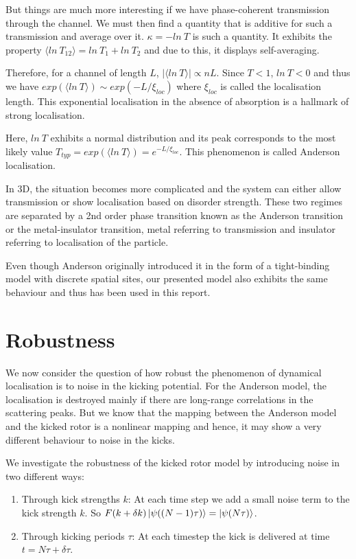 \documentclass[twocolumn,nobalancelastpage]{report}
\begin{document}
But things
are much more interesting if we have phase-coherent transmission through
the channel. We must then find a quantity that is additive for such a
transmission and average over it. $\kappa = - ln\ T$ is such a quantity.
It exhibits the property $\langle ln\ T_{12} \rangle = ln\ T_1 + ln\ T_2$ and
due to this, it displays self-averaging.

Therefore, for a channel of
length $L$, $|\langle ln\ T \rangle| \propto nL$. Since $T < 1$, $ln\ T < 0$
and thus we have $exp(\langle ln\ T \rangle) \sim exp(-L/\xi_{loc})$ where
$\xi_{loc}$ is called the localisation length. This exponential localisation
in the absence of absorption is a hallmark of strong localisation.

Here,
$ln\ T$ exhibits a normal distribution and its peak corresponds to the most
likely value $T_{typ} = exp(\langle ln\ T \rangle) = e^{-L/\xi_{loc}}$. This
phenomenon is called Anderson localisation.

In 3D, the situation becomes
more complicated and the system can either allow transmission or show
localisation based on disorder strength. These two regimes are separated by
a 2nd order phase transition known as the Anderson transition or the
metal-insulator transition, metal referring to transmission and insulator
referring to localisation of the particle.

Even though Anderson originally
introduced it in the form of a tight-binding model with discrete spatial
sites, our presented model also exhibits the same behaviour and thus has
been used in this report.

\section{Robustness}
We now consider the question of how robust the phenomenon of dynamical
localisation is to noise in the kicking potential. For the Anderson model,
the localisation is destroyed mainly if there are long-range correlations
in the scattering peaks. But we know that the mapping between the Anderson
model and the kicked rotor is a nonlinear mapping and hence, it may show
a very different behaviour to noise in the kicks.

We investigate the robustness of the kicked rotor model by introducing noise
in two different ways:
\begin{enumerate}
    \item Through kick strengths $k$: At each time step we add a small noise
    term to the kick strength $k$. So $F(k+\delta k)\ket{\psi((N-1)\tau)} =
    \ket{\psi(N\tau)}$.

    \item Through kicking periods $\tau$: At each timestep the kick is
    delivered at time $t = N\tau + \delta \tau$.
\end{enumerate}
\end{document}
